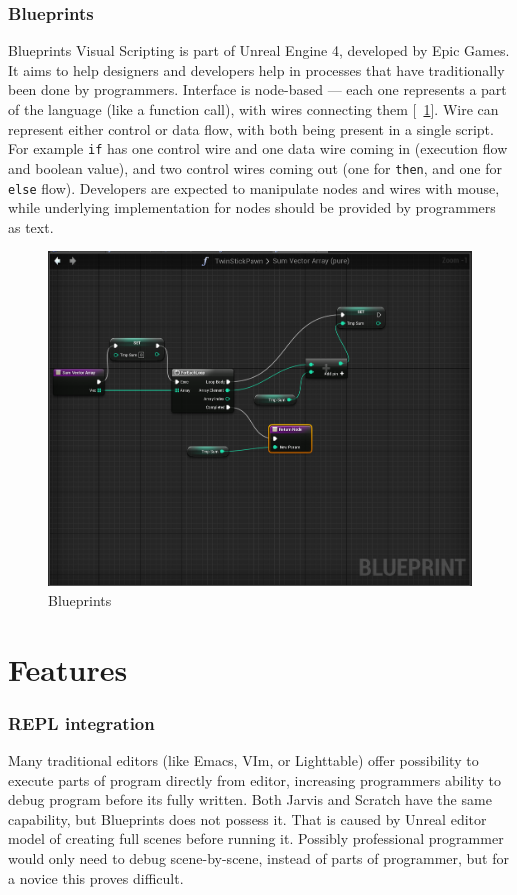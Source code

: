 \documentclass[english,mgr,shortabstract]{iithesis}
\newcommand*{\figref}[1]{[\textbf{\figurename}~\ref{#1}]}
\begin{document}
\subsubsection*{Blueprints}
Blueprints Visual Scripting is part of Unreal Engine 4, developed by Epic Games.
It aims to help designers and developers help in processes that have
traditionally been done by programmers.
Interface is node-based --- each one represents a part of the language (like a
function call), with wires connecting them \figref{fig:blueprints}.
Wire can represent either control or data flow, with both being present in a
single script.
For example \lstinline|if| has one control wire and one data wire coming in (execution
flow and boolean value), and two control wires coming out (one for \lstinline|then|, and
one for \lstinline|else| flow).
Developers are expected to manipulate nodes and wires with mouse, while
underlying implementation for nodes should be provided by programmers as text.

\begin{figure}[hbt]
  \centering
  \includegraphics[scale=0.3]{img/b-wires}
  \caption{Blueprints}
\label{fig:blueprints}
\end{figure}

\section{Features}

\subsubsection*{REPL integration}
Many traditional editors (like Emacs, VIm, or Lighttable) offer possibility to
execute parts of program directly from editor, increasing programmers ability to
debug program before its fully written.
Both Jarvis and Scratch have the same capability, but Blueprints does not
possess it. That is caused by Unreal editor model of creating full scenes before
running it. Possibly professional programmer would only need to debug
scene-by-scene, instead of parts of programmer, but for a novice this proves
difficult.
\end{document}

